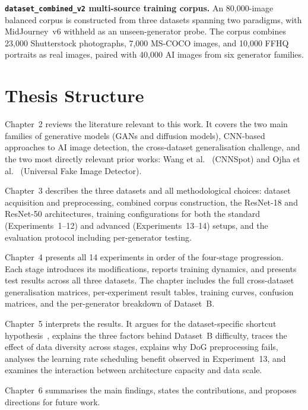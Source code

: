 \textbf{\texttt{dataset\_combined\_v2} multi-source training corpus.} An 80,000-image
balanced corpus is constructed from three datasets spanning two paradigms, with
MidJourney~v6 withheld as an unseen-generator probe. The corpus combines 23,000
Shutterstock photographs, 7,000 MS-COCO images, and 10,000 FFHQ portraits as real images,
paired with 40,000 AI images from six generator families.


\section{Thesis Structure}
\label{sec:structure}

Chapter~2 reviews the literature relevant to this work. It covers the two main families
of generative models (GANs and diffusion models), CNN-based approaches to AI image
detection, the cross-dataset generalisation challenge, and the two most directly relevant
prior works: Wang et al.~\cite{wang2020} (CNNSpot) and Ojha et al.~\cite{ojha2023}
(Universal Fake Image Detector).

Chapter~3 describes the three datasets and all methodological choices: dataset acquisition
and preprocessing, combined corpus construction, the ResNet-18 and ResNet-50
architectures, training configurations for both the standard (Experiments~1--12) and
advanced (Experiments~13--14) setups, and the evaluation protocol including per-generator
testing.

Chapter~4 presents all 14 experiments in order of the four-stage progression. Each stage
introduces its modifications, reports training dynamics, and presents test results across
all three datasets. The chapter includes the full cross-dataset generalisation matrices,
per-experiment result tables, training curves, confusion matrices, and the per-generator
breakdown of Dataset~B.

Chapter~5 interprets the results. It argues for the dataset-specific shortcut hypothesis~\cite{geirhos2020shortcut},
explains the three factors behind Dataset~B difficulty, traces the effect of data
diversity across stages, explains why DoG preprocessing fails, analyses the learning rate
scheduling benefit observed in Experiment~13, and examines the interaction between
architecture capacity and data scale.

Chapter~6 summarises the main findings, states the contributions, and proposes directions
for future work.
